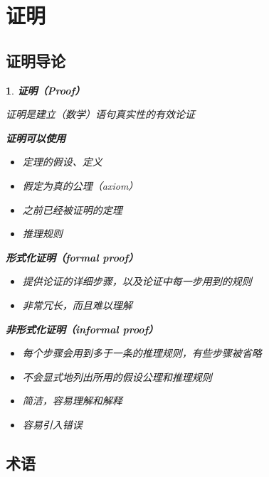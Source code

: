 \documentclass[UTF8]{report}
\theoremstyle{MyLineTheoremStyle} %
\theoremstyle{MyBlockTheoremStyle} %
\theoremstyle{MySubsubsectionStyle} %
\newtheorem{definition}{}
\begin{document}
\section{证明}

\subsection{证明导论}

\begin{definition}
    \textbf{证明（Proof）}\par
    证明是建立（数学）语句真实性的有效论证\par

    \textbf{证明可以使用}\par
    \begin{itemize}
        \item 定理的假设、定义
        \item 假定为真的公理（axiom）
        \item 之前已经被证明的定理
        \item 推理规则
    \end{itemize}

    \textbf{形式化证明（formal proof）}\par
    \begin{itemize}
        \item 提供论证的详细步骤，以及论证中每一步用到的规则
        \item 非常冗长，而且难以理解
    \end{itemize}

    \textbf{非形式化证明（informal proof）}\par
    \begin{itemize}
        \item 每个步骤会用到多于一条的推理规则，有些步骤被省略
        \item 不会显式地列出所用的假设公理和推理规则
        \item 简洁，容易理解和解释
        \item 容易引入错误
    \end{itemize}
\end{definition}

\subsection{术语}
\end{document}

